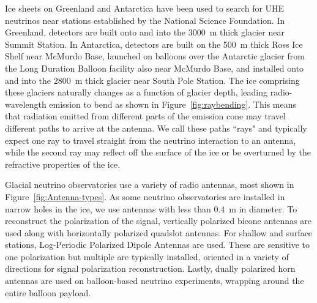   Ice sheets on Greenland and Antarctica have been used to search for UHE neutrinos near stations established by the National Science Foundation. 
  In Greenland, detectors are built onto and into the 3000~m thick glacier near Summit Station. 
  In Antarctica, detectors are built on the 500~m thick Ross Ice Shelf near McMurdo Base, launched on balloons over the Antarctic glacier from the Long Duration Balloon facility also near McMurdo Base, and installed onto and into the 2800~m thick glacier near South Pole Station. 
  The ice comprising these glaciers naturally changes as a function of glacier depth, leading radio-wavelength emission to bend as shown in Figure~\ref{fig:raybending}. 
  This means that radiation emitted from different parts of the emission cone may travel different paths to arrive at the antenna. 
  We call these paths ``rays" and typically expect one ray to travel straight from the neutrino interaction to an antenna, while the second ray  may reflect off the surface of the ice or be overturned by the refractive properties of the ice.

  Glacial neutrino observatories use a variety of radio antennas, most shown in Figure~\ref{fig:Antenna-types}. 
  As some neutrino observatories are installed in narrow holes in the ice, we use antennas with less than 0.4~m in diameter. 
  To reconstruct the polarization of the signal, vertically polarized bicone antennas are used along with horizontally polarized quadslot antennas.%
  For shallow and surface stations, Log-Periodic Polarized Dipole Antennas are used. 
  These are sensitive to one polarization but multiple are typically installed, oriented in a variety of directions for signal polarization reconstruction.
  Lastly, dually polarized horn antennas are used on balloon-based neutrino experiments, wrapping around the entire balloon payload.

